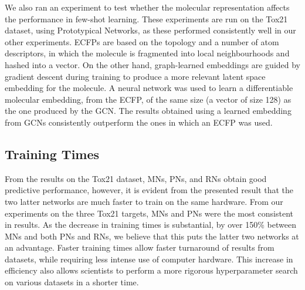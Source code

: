 We also ran an experiment to test whether the molecular representation affects the performance in few-shot learning. These experiments are run on the Tox21 dataset, using Prototypical Networks, as these performed consistently well in our other experiments. ECFPs are based on the topology and a number of atom descriptors, in which the molecule is fragmented into local neighbourhoods and hashed into a vector. On the other hand, graph-learned embeddings are guided by gradient descent during training to produce a more relevant latent space embedding for the molecule. A neural network was used to learn a differentiable molecular embedding, from the ECFP, of the same size (a vector of size 128) as the one produced by the GCN. The results obtained using a learned embedding from GCNs consistently outperform the ones in which an ECFP was used.

\subsection{Training Times}

From the results on the Tox21 dataset, MNs, PNs, and RNs obtain good predictive performance, however, it is evident from the presented result that the two latter networks are much faster to train on the same hardware. From our experiments on the three Tox21 targets, MNs and PNs were the most consistent in results. As the decrease in training times is substantial, by over 150\% between MNs and both PNs and RNs, we believe that this puts the latter two networks at an advantage. Faster training times allow faster turnaround of results from datasets, while requiring less intense use of computer hardware. This increase in efficiency also allows scientists to perform a more rigorous hyperparameter search on various datasets in a shorter time.